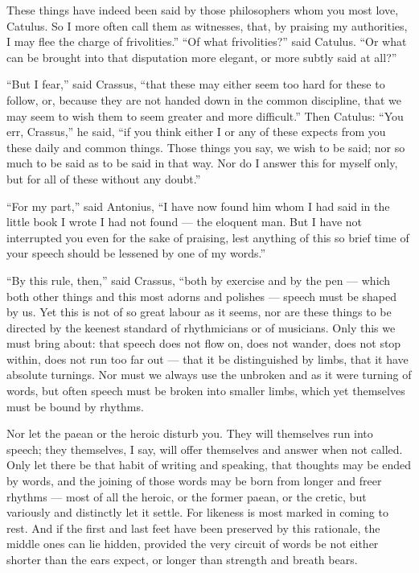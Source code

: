  These things have indeed been said by those philosophers whom you most love, Catulus. So I more often call them as witnesses, that, by praising my authorities, I may flee the charge of frivolities.'' ``Of what frivolities?'' said Catulus. ``Or what can be brought into that disputation more elegant, or more subtly said at all?''

 ``But I fear,'' said Crassus, ``that these may either seem too hard for these to follow, or, because they are not handed down in the common discipline, that we may seem to wish them to seem greater and more difficult.'' Then Catulus: ``You err, Crassus,'' he said, ``if you think either I or any of these expects from you these daily and common things. Those things you say, we wish to be said; nor so much to be said as to be said in that way. Nor do I answer this for myself only, but for all of these without any doubt.''

 ``For my part,'' said Antonius, ``I have now found him whom I had said in the little book I wrote I had not found — the eloquent man. But I have not interrupted you even for the sake of praising, lest anything of this so brief time of your speech should be lessened by one of my words.''

 ``By this rule, then,'' said Crassus, ``both by exercise and by the pen — which both other things and this most adorns and polishes — speech must be shaped by us. Yet this is not of so great labour as it seems, nor are these things to be directed by the keenest standard of rhythmicians or of musicians. Only this we must bring about: that speech does not flow on, does not wander, does not stop within, does not run too far out — that it be distinguished by limbs, that it have absolute turnings. Nor must we always use the unbroken and as it were turning of words, but often speech must be broken into smaller limbs, which yet themselves must be bound by rhythms.

 Nor let the paean or the heroic disturb you. They will themselves run into speech; they themselves, I say, will offer themselves and answer when not called. Only let there be that habit of writing and speaking, that thoughts may be ended by words, and the joining of those words may be born from longer and freer rhythms — most of all the heroic, or the former paean, or the cretic, but variously and distinctly let it settle. For likeness is most marked in coming to rest. And if the first and last feet have been preserved by this rationale, the middle ones can lie hidden, provided the very circuit of words be not either shorter than the ears expect, or longer than strength and breath bears.


